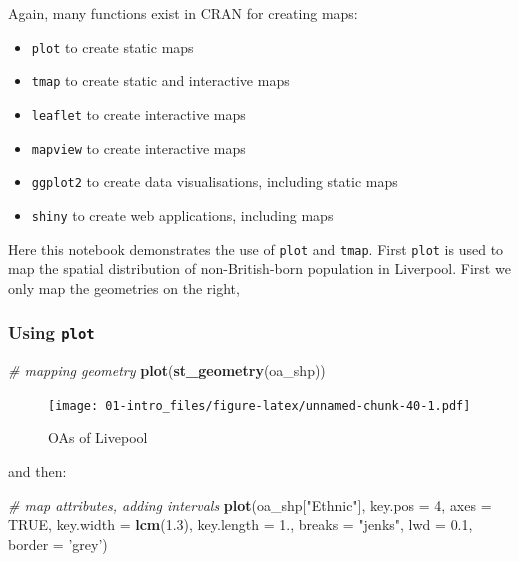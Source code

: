 \documentclass[]{book}
\newenvironment{Shaded}{\begin{snugshade}}{\end{snugshade}}
\newcommand{\KeywordTok}[1]{\textcolor[rgb]{0.13,0.29,0.53}{\textbf{#1}}}
\newcommand{\DataTypeTok}[1]{\textcolor[rgb]{0.13,0.29,0.53}{#1}}
\newcommand{\DecValTok}[1]{\textcolor[rgb]{0.00,0.00,0.81}{#1}}
\newcommand{\FloatTok}[1]{\textcolor[rgb]{0.00,0.00,0.81}{#1}}
\newcommand{\StringTok}[1]{\textcolor[rgb]{0.31,0.60,0.02}{#1}}
\newcommand{\CommentTok}[1]{\textcolor[rgb]{0.56,0.35,0.01}{\textit{#1}}}
\newcommand{\OtherTok}[1]{\textcolor[rgb]{0.56,0.35,0.01}{#1}}
\newcommand{\NormalTok}[1]{#1}
\providecommand{\tightlist}{%
  \setlength{\itemsep}{0pt}\setlength{\parskip}{0pt}}
\begin{document}
Again, many functions exist in CRAN for creating maps:

\begin{itemize}
\tightlist
\item
  \texttt{plot} to create static maps
\item
  \texttt{tmap} to create static and interactive maps
\item
  \texttt{leaflet} to create interactive maps
\item
  \texttt{mapview} to create interactive maps
\item
  \texttt{ggplot2} to create data visualisations, including static maps
\item
  \texttt{shiny} to create web applications, including maps
\end{itemize}

Here this notebook demonstrates the use of \texttt{plot} and
\texttt{tmap}. First \texttt{plot} is used to map the spatial
distribution of non-British-born population in Liverpool. First we only
map the geometries on the right,

\subsubsection{\texorpdfstring{Using
\texttt{plot}}{Using plot}}\label{using-plot}

\begin{Shaded}
\begin{Highlighting}[]
\CommentTok{# mapping geometry}
\KeywordTok{plot}\NormalTok{(}\KeywordTok{st_geometry}\NormalTok{(oa_shp))}
\end{Highlighting}
\end{Shaded}

\begin{figure}
\centering
\texttt{[image: 01-intro\_files/figure-latex/unnamed-chunk-40-1.pdf]}
\caption{\label{fig:unnamed-chunk-40}OAs of Livepool}
\end{figure}

and then:

\begin{Shaded}
\begin{Highlighting}[]
\CommentTok{# map attributes, adding intervals}
\KeywordTok{plot}\NormalTok{(oa_shp[}\StringTok{"Ethnic"}\NormalTok{], }\DataTypeTok{key.pos =} \DecValTok{4}\NormalTok{, }\DataTypeTok{axes =} \OtherTok{TRUE}\NormalTok{, }\DataTypeTok{key.width =} \KeywordTok{lcm}\NormalTok{(}\FloatTok{1.3}\NormalTok{), }\DataTypeTok{key.length =} \DecValTok{1}\NormalTok{.,}
     \DataTypeTok{breaks =} \StringTok{"jenks"}\NormalTok{, }\DataTypeTok{lwd =} \FloatTok{0.1}\NormalTok{, }\DataTypeTok{border =} \StringTok{'grey'}\NormalTok{) }
\end{Highlighting}
\end{Shaded}
\end{document}
